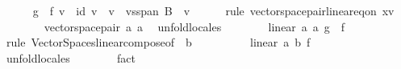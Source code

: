 \begin{isabellebody}
\ \ \ \ \isamarkupfalse%
\ {\isachardoublequoteopen}{\isacharparenleft}{\kern0pt}{\isacharquery}{\kern0pt}g\ {\isasymcirc}\ f{\isacharparenright}{\kern0pt}\ v\ {\isacharequal}{\kern0pt}\ id\ v{\isachardoublequoteclose}\ \ {\isachardoublequoteopen}v\ {\isasymin}\ vs{}{\isachardot}{\kern0pt}span\ B{\isachardoublequoteclose}\ \ v\isanewline
\ \ \ \ \isamarkupfalse%
\ {\isacharparenleft}{\kern0pt}rule\ vector{\isacharunderscore}{\kern0pt}space{\isacharunderscore}{\kern0pt}pair{\isachardot}{\kern0pt}linear{\isacharunderscore}{\kern0pt}eq{\isacharunderscore}{\kern0pt}on{\isacharbrackleft}{\kern0pt}\ x{\isacharequal}{\kern0pt}v{\isacharbrackright}{\kern0pt}{\isacharparenright}{\kern0pt}\isanewline
\ \ \ \ \ \ \isamarkupfalse%
\ {\isachardoublequoteopen}vector{\isacharunderscore}{\kern0pt}space{\isacharunderscore}{\kern0pt}pair\ {\isacharparenleft}{\kern0pt}{\isacharasterisk}{\kern0pt}a{\isacharparenright}{\kern0pt}\ {\isacharparenleft}{\kern0pt}{\isacharasterisk}{\kern0pt}a{\isacharparenright}{\kern0pt}{\isachardoublequoteclose}\ \isamarkupfalse%
\ unfold{\isacharunderscore}{\kern0pt}locales\isanewline
\ \ \ \ \ \ \isamarkupfalse%
\ {\isachardoublequoteopen}linear\ {\isacharparenleft}{\kern0pt}{\isacharasterisk}{\kern0pt}a{\isacharparenright}{\kern0pt}\ {\isacharparenleft}{\kern0pt}{\isacharasterisk}{\kern0pt}a{\isacharparenright}{\kern0pt}\ {\isacharparenleft}{\kern0pt}{\isacharquery}{\kern0pt}g\ {\isasymcirc}\ f{\isacharparenright}{\kern0pt}{\isachardoublequoteclose}\isanewline
\ \ \ \ \ \ \isamarkupfalse%
\ {\isacharparenleft}{\kern0pt}rule\ Vector{\isacharunderscore}{\kern0pt}Spaces{\isachardot}{\kern0pt}linear{\isacharunderscore}{\kern0pt}compose{\isacharbrackleft}{\kern0pt}of\ {\isacharunderscore}{\kern0pt}\ {\isachardoublequoteopen}{\isacharparenleft}{\kern0pt}{\isacharasterisk}{\kern0pt}b{\isacharparenright}{\kern0pt}{\isachardoublequoteclose}{\isacharbrackright}{\kern0pt}{\isacharparenright}{\kern0pt}\isanewline
\ \ \ \ \ \ \ \ \isamarkupfalse%
\ {\isachardoublequoteopen}linear\ {\isacharparenleft}{\kern0pt}{\isacharasterisk}{\kern0pt}a{\isacharparenright}{\kern0pt}\ {\isacharparenleft}{\kern0pt}{\isacharasterisk}{\kern0pt}b{\isacharparenright}{\kern0pt}\ f{\isachardoublequoteclose}\isanewline
\ \ \ \ \ \ \ \ \ \ \isamarkupfalse%
\ unfold{\isacharunderscore}{\kern0pt}locales\isanewline
\ \ \ \ \ \ \isamarkupfalse%
\ fact\isanewline
\ \ \ \ \ \ \isamarkupfalse%

\end{isabellebody}
